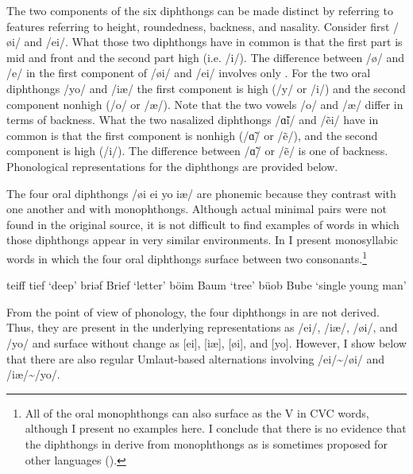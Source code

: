The two components of the six diphthongs can be made distinct by referring to features referring to height, roundedness, backness, and nasality. Consider first /øi/ and /ei/. What those two diphthongs have in common is that the first part is mid and front and the second part high (i.e. /i/). The difference between /ø/ and /e/ in the first component of /øi/ and /ei/ involves only . For the two oral diphthongs /yo/ and /iæ/ the first component is high (/y/ or /i/) and the second component nonhigh (/o/ or /æ/). Note that the two vowels /o/ and /æ/ differ in terms of backness. What the two nasalized diphthongs /\~ɑi/ and /ẽi/ have in common is that the first component is nonhigh (/\~ɑ/ or /ẽ/), and the second component is high (/i/). The difference between /\~ɑ/ or /ẽ/ is one of backness. Phonological representations for the diphthongs are provided below.

The four oral diphthongs /øi ei yo iæ/ are phonemic because they contrast with one another and with monophthongs. Although actual minimal pairs were not found in the original source, it is not difficult to find examples of words in which those diphthongs appear in very similar environments. In  I present monosyllabic words in which the four oral diphthongs surface between two consonants.\footnote{{All of the oral monophthongs can also surface as the V in CVC words, although I present no examples here. I conclude that there is no evidence that the diphthongs in  derive from monophthongs as is sometimes proposed for other languages ().}}

\ea%
\label{ex:6:2}
\ea\label{ex:6:2a} teiff  \tab [teiff] \tab tief  \tab ‘deep’             
\ex\label{ex:6:2b} briəf  \tab [briæf] \tab Brief \tab ‘letter’           
\ex\label{ex:6:2c} böim   \tab [bøim]  \tab Baum  \tab ‘tree’             
\ex\label{ex:6:2d} büob   \tab [byob]  \tab Bube  \tab ‘single young man’ 
\z 
\z 

From the point of view of phonology, the four diphthongs in  are not derived. Thus, they are present in the underlying representations as /ei/, /iæ/, /øi/, and /yo/ and surface without change as [ei], [iæ], [øi], and [yo]. However, I show below that there are also regular Umlaut-based alternations involving /ei/{\textasciitilde}/øi/ and /iæ/{\textasciitilde}/yo/.

